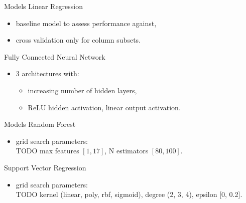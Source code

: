 \documentclass[xcolor=table]{beamer} %
\begin{document}
\begin{frame}{Models}
  \vspace{-0.5cm}
  Linear Regression
  \begin{itemize}
      \item baseline model to assess performance against,
      \item cross validation only for column subsets.
  \end{itemize}
  Fully Connected Neural Network
  \begin{itemize}
      \item 3 architectures with:
        \begin{itemize}
            \item increasing number of hidden layers,
            \item ReLU hidden activation, linear output activation.
        \end{itemize}
  \end{itemize}
\end{frame}

\begin{frame}{Models}
  \vspace{-0.5cm}
  Random Forest
  \begin{itemize}
      \item grid search parameters:\\
      TODO
      max features $[1, 17]$, N estimators $[80, 100]$.
  \end{itemize}
  Support Vector Regression
  \begin{itemize}
      \item grid search parameters:\\
      TODO
      kernel (linear, poly, rbf, sigmoid), degree (2, 3, 4), epsilon [0, 0.2].
  \end{itemize}
\end{frame}
\end{document}

